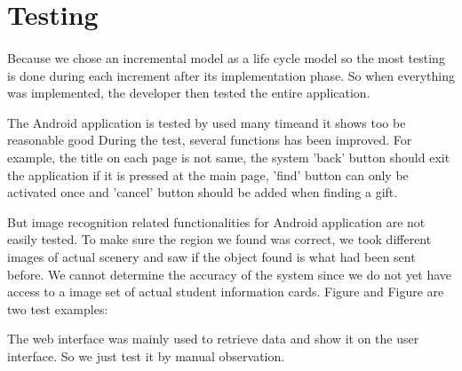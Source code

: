 \section{Testing}												
\label{sec:Testing}
\paragraph{} Because we chose an incremental model as a life cycle model so the most testing is done during each increment after its implementation phase. So when everything was implemented, the developer then tested the entire application.
\par The Android application is tested by used many timeand it shows too be reasonable good During the test, several functions has been improved. For example, the title on each page is not same, the system 'back' button should exit the application if it is pressed at the main page, 'find' button can only be activated once and 'cancel' button should be added when finding a gift.  
\par But image recognition related functionalities for Android application are not easily tested. To make sure the region we found was correct, we took different images of actual scenery and saw if the object found is what had been sent before. We cannot determine the accuracy of the system since we do not yet have access to a image set of actual student information cards. Figure and Figure are two test examples: 
\par The web interface was mainly used to retrieve data and show it on the user interface. So we just test it by manual observation. 




